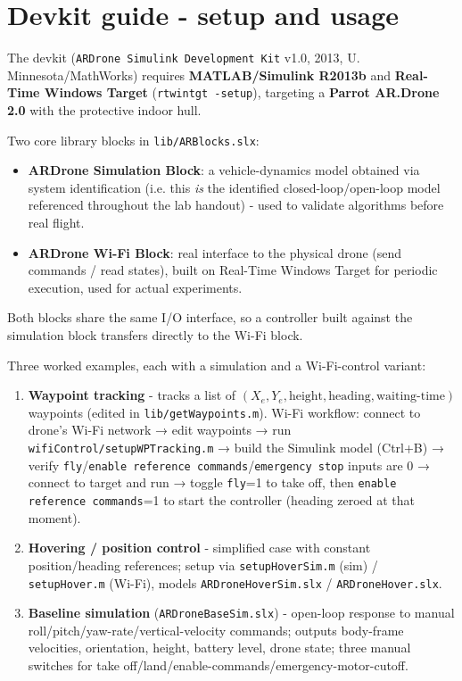 \documentclass[11pt]{article}
\begin{document}
\section{Devkit guide - setup and usage}

The devkit (\texttt{ARDrone Simulink Development Kit} v1.0, 2013, U. Minnesota/MathWorks) requires \textbf{MATLAB/Simulink R2013b} and \textbf{Real-Time Windows Target} (\texttt{rtwintgt -\allowbreak{}setup}), targeting a \textbf{Parrot AR.Drone 2.0} with the protective indoor hull.

Two core library blocks in \texttt{lib/ARBlocks.slx}:
\begin{itemize}
\item \textbf{ARDrone Simulation Block}: a vehicle-dynamics model obtained via system identification (i.e. this \textit{is} the identified closed-loop/open-loop model referenced throughout the lab handout) - used to validate algorithms before real flight.
\item \textbf{ARDrone Wi-Fi Block}: real interface to the physical drone (send commands / read states), built on Real-Time Windows Target for periodic execution, used for actual experiments.
\end{itemize}
Both blocks share the same I/O interface, so a controller built against the simulation block transfers directly to the Wi-Fi block.

Three worked examples, each with a simulation and a Wi-Fi-control variant:
\begin{enumerate}
\item \textbf{Waypoint tracking} - tracks a list of $(X_e, Y_e, \text{height}, \text{heading}, \text{waiting-time})$ waypoints (edited in \texttt{lib/\allowbreak{}getWaypoints.m}). Wi-Fi workflow: connect to drone's Wi-Fi network → edit waypoints → run \texttt{wifiControl/\allowbreak{}setupWPTracking.m} → build the Simulink model (Ctrl+B) → verify \texttt{fly}/\texttt{enable reference commands}/\texttt{emergency stop} inputs are 0 → connect to target and run → toggle \texttt{fly}=1 to take off, then \texttt{enable reference commands}=1 to start the controller (heading zeroed at that moment).
\item \textbf{Hovering / position control} - simplified case with constant position/heading references; setup via \texttt{setupHoverSim.m} (sim) / \texttt{setupHover.m} (Wi-Fi), models \texttt{ARDroneHoverSim.slx} / \texttt{ARDroneHover.slx}.
\item \textbf{Baseline simulation} (\texttt{ARDroneBaseSim.slx}) - open-loop response to manual roll/pitch/yaw-rate/vertical-velocity commands; outputs body-frame velocities, orientation, height, battery level, drone state; three manual switches for take off/land/enable-commands/emergency-motor-cutoff.
\end{enumerate}
\end{document}
